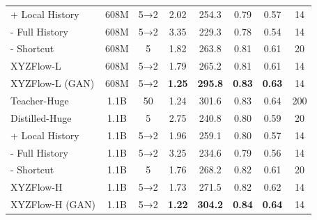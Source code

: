 \documentclass{article}
\theoremstyle{plain}
\theoremstyle{definition}
\theoremstyle{remark}
\begin{document}
\begin{table}[ht]
\begin{tabular}{@{}lccccccc@{}}
+ Local History & 608M & 5→2 & 2.02{\color{red}{\tiny$\downarrow$0.83}} & 254.3{\color{red}{\tiny$\uparrow$19.2}} & 0.79 & 0.57 & 14 \\
- Full History & 608M & 5→2 & 3.35{\color{blue}{\tiny$\uparrow$0.50}} & 229.3{\color{blue}{\tiny$\downarrow$5.8}} & 0.78{\color{blue}{\tiny$\downarrow$0.01}} & 0.54{\color{blue}{\tiny$\downarrow$0.03}} & 14 \\
- Shortcut & 608M & 5 & 1.82{\color{red}{\tiny$\downarrow$1.03}} & 263.8{\color{red}{\tiny$\uparrow$28.7}} & 0.81{\color{red}{\tiny$\uparrow$0.02}} & 0.61{\color{red}{\tiny$\uparrow$0.04}} & 20 \\
XYZFlow-L & 608M & 5→2 & 1.79{\color{red}{\tiny$\downarrow$1.06}} & 265.2{\color{red}{\tiny$\uparrow$30.1}} & 0.81{\color{red}{\tiny$\uparrow$0.02}} & 0.61{\color{red}{\tiny$\uparrow$0.04}} & 14 \\
\rowcolor{gray!20}
XYZFlow-L (GAN) & 608M & 5→2 & \textbf{1.25{\color{red}{\tiny$\downarrow$1.60}}} & \textbf{295.8{\color{red}{\tiny$\uparrow$60.7}}} & \textbf{0.83{\color{red}{\tiny$\uparrow$0.04}}} & \textbf{0.63{\color{red}{\tiny$\uparrow$0.06}}} & 14 \\
\midrule
\rowcolor{gray!10}
Teacher-Huge & 1.1B & 50 & 1.24 & 301.6 & 0.83 & 0.64 & 200 \\
Distilled-Huge & 1.1B & 5 & 2.75 & 240.8 & 0.80 & 0.59 & 20 \\
+ Local History & 1.1B & 5→2 & 1.96{\color{red}{\tiny$\downarrow$0.79}} & 259.1{\color{red}{\tiny$\uparrow$18.3}} & 0.80 & 0.57{\color{blue}{\tiny$\downarrow$0.02}} & 14 \\
- Full History & 1.1B & 5→2 & 3.25{\color{blue}{\tiny$\uparrow$0.50}} & 234.6{\color{blue}{\tiny$\downarrow$6.2}} & 0.79{\color{blue}{\tiny$\downarrow$0.01}} & 0.56{\color{blue}{\tiny$\downarrow$0.03}} & 14 \\
- Shortcut & 1.1B & 5 & 1.76{\color{red}{\tiny$\downarrow$0.99}} & 268.2{\color{red}{\tiny$\uparrow$27.4}} & 0.82{\color{red}{\tiny$\uparrow$0.02}} & 0.61{\color{red}{\tiny$\uparrow$0.02}} & 20 \\
XYZFlow-H & 1.1B & 5→2 & 1.73{\color{red}{\tiny$\downarrow$1.02}} & 271.5{\color{red}{\tiny$\uparrow$30.7}} & 0.82{\color{red}{\tiny$\uparrow$0.02}} & 0.62{\color{red}{\tiny$\uparrow$0.03}} & 14 \\
\rowcolor{gray!20}
XYZFlow-H (GAN) & 1.1B & 5→2 & \textbf{1.22{\color{red}{\tiny$\downarrow$1.53}}} & \textbf{304.2{\color{red}{\tiny$\uparrow$63.4}}} & \textbf{0.84{\color{red}{\tiny$\uparrow$0.04}}} & \textbf{0.64{\color{red}{\tiny$\uparrow$0.05}}} & 14 \\

\end{tabular}
\end{table}
\end{document}
